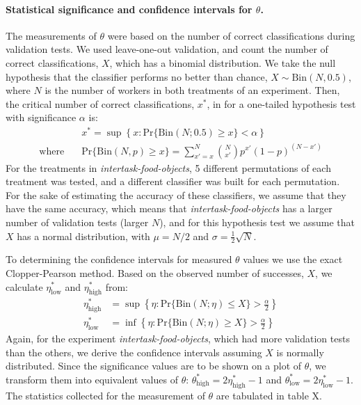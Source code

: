 \documentclass[12pt]{article}
\begin{document}
\paragraph{Statistical significance and confidence intervals for $\theta$.}
The measurements of $\theta$ were based on the number of correct 
classifications during validation tests.  We used leave-one-out validation,
and count the number of correct classifications, $X$, which has a binomial
distribution.  We take the null hypothesis that the classifier performs
no better than chance, $X \sim \mathrm{Bin}(N,0.5)$, where $N$ is the number 
of workers in both treatments of an experiment.  Then, the critical number 
of correct classifications, $x^*$, in for a one-tailed hypothesis test with
significance $\alpha$ is:
\begin{align}
	&x^* = \sup \left\{
			x: \mathrm{Pr}\{ \mathrm{Bin}(N;0.5) \geq x \} < \alpha
		\right\}\\
	\text{where}\quad &\mathrm{Pr}\{ \mathrm{Bin}(N,p) \geq x \} = 
		\sum_{x'=x}^{N} \binom{N}{x'}p^{x'}(1-p)^{(N-x')}
\end{align}
For the treatments in \textit{intertask-food-objects}, 5 different 
permutations of each treatment was tested, and a different classifier was 
built for each permutation.  For the sake of estimating the accuracy of 
these classifiers, we assume that they have the same accuracy, which means
that \textit{intertask-food-objects} has a larger number of validation tests
(larger $N$), and for this hypothesis test we assume that $X$ has a normal 
distribution, with $\mu=N/2$ and $\sigma = \frac{1}{2}\sqrt{N}$.

To determining the confidence intervals for measured $\theta$ values we 
use the exact Clopper-Pearson method.  
Based on the observed number of successes, $X$, we calculate 
$\eta^*_\mathrm{low}$ and $\eta^*_\mathrm{high}$ from:
\begin{align}
	\eta^*_\mathrm{high} &= \sup
		\left\{
			\eta : \mathrm{Pr}\{\mathrm{Bin}(N; \eta) \leq X \} > 
				\frac{\alpha}{2}
		\right\} \\
	\eta^*_\mathrm{low} &= \inf
		\left\{
			\eta : \mathrm{Pr}\{\mathrm{Bin}(N; \eta) \geq X \} > 
				\frac{\alpha}{2}
		\right\}
\end{align}
Again, for the experiment \textit{intertask-food-objects}, which had 
more validation tests than the others, we derive the confidence intervals
assuming $X$ is normally distributed.
Since the significance values are to be shown on a plot of $\theta$, we 
transform them into equivalent values of 
$\theta$: $\theta^*_\mathrm{high} = 2\eta^*_\mathrm{high} - 1$ and 
$\theta^*_\mathrm{low} = 2\eta^*_\mathrm{low} - 1$.
The statistics collected for the measurement of $\theta$ are tabulated in 
table X.
\end{document}
